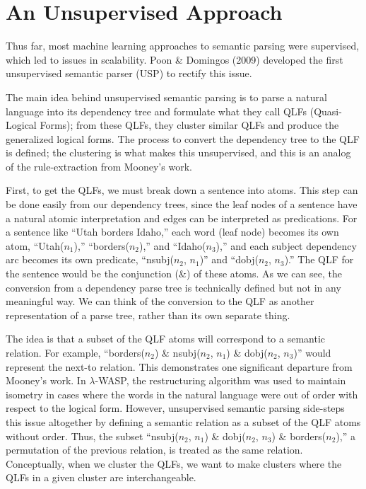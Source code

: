 \documentclass[a4paper]{article}
\theoremstyle{definition}
\begin{document}
\section{An Unsupervised Approach}

Thus far, most machine learning approaches to semantic parsing were supervised, which led to issues in scalability. Poon \& Domingos (2009) developed the first unsupervised semantic parser (USP) to rectify this issue.

\quad The main idea behind unsupervised semantic parsing is to parse a natural language into its dependency tree and formulate what they call QLFs (Quasi-Logical Forms); from these QLFs, they cluster similar QLFs and produce the generalized logical forms. The process to convert the dependency tree to the QLF is defined; the clustering is what makes this unsupervised, and this is an analog of the rule-extraction from Mooney's work.

\quad First, to get the QLFs, we must break down a sentence into atoms. This step can be done easily from our dependency trees, since the leaf nodes of a sentence have a natural atomic interpretation and edges can be interpreted as predications. For a sentence like ``Utah borders Idaho,'' each word (leaf node) becomes its own atom, ``Utah($n_1$),'' ``borders($n_2$),'' and ``Idaho($n_3$),'' and each subject dependency arc becomes its own predicate, ``nsubj($n_2$, $n_1$)'' and ``dobj($n_2$, $n_3$).'' The QLF for the sentence would be the conjunction (\&) of these atoms. As we can see, the conversion from a dependency parse tree is technically defined but not in any meaningful way. We can think of the conversion to the QLF as another representation of a parse tree, rather than its own separate thing.

\quad The idea is that a subset of the QLF atoms will correspond to a semantic relation. For example, ``borders($n_2$) \& nsubj($n_2$, $n_1$) \& dobj($n_2$, $n_3$)'' would represent the next-to relation. This demonstrates one significant departure from Mooney's work. In $\lambda$-WASP, the restructuring algorithm was used to maintain isometry in cases where the words in the natural language were out of order with respect to the logical form. However, unsupervised semantic parsing side-steps this issue altogether by defining a semantic relation as a subset of the QLF atoms without order. Thus, the subset ``nsubj($n_2$, $n_1$) \& dobj($n_2$, $n_3$) \& borders($n_2$),'' a permutation of the previous relation, is treated as the same relation. Conceptually, when we cluster the QLFs, we want to make clusters where the QLFs in a given cluster are interchangeable.
\end{document}
